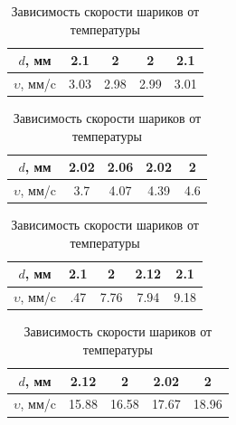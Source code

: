 \begin{table}[h!]
    \centering
    \caption{Зависимость скорости шариков от температуры}
    \begin{subtable}[h!]{0.49\textwidth}
        \begin{tabular}{|c|c|c|c|c|}
            \hline
            $d$, мм & 2.1 & 2 & 2 & 2.1\\\hline
            $\upsilon$, мм/c & 3.03 & 2.98 & 2.99 & 3.01\\\hline
        \end{tabular}
    \end{subtable}
    \hfill
    \begin{subtable}[h!]{0.49\textwidth}
        \begin{tabular}{|c|c|c|c|c|}
            \hline
            $d$, мм & 2.02 & 2.06 & 2.02 & 2\\\hline
            $\upsilon$, мм/c & 3.7 & 4.07 & 4.39 & 4.6\\\hline
        \end{tabular}
    \end{subtable}
    \vfill
    \begin{subtable}[h!]{0.49\textwidth}
        \begin{tabular}{|c|c|c|c|c|}
            \hline
            $d$, мм & 2.1 & 2 & 2.12 & 2.1\\\hline
            $\upsilon$, мм/c & \7.47 & 7.76 & 7.94 & 9.18\\\hline
        \end{tabular}
    \end{subtable}
    \hfill
    \begin{subtable}[h!]{0.49\textwidth}
        \begin{tabular}{|c|c|c|c|c|}
            \hline
            $d$, мм & 2.12 & 2 & 2.02 & 2\\\hline
            $\upsilon$, мм/c & 15.88 & 16.58 & 17.67 & 18.96\\\hline
        \end{tabular}
    \end{subtable}
\end{table}

